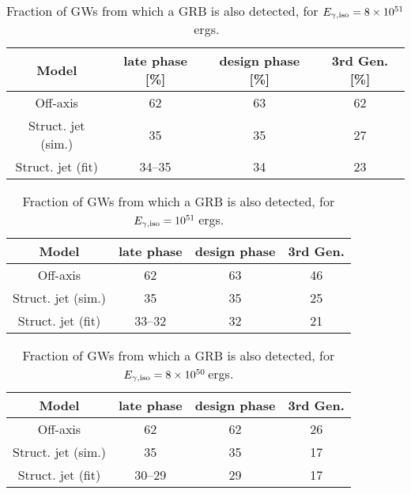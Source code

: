 \begin{table}
	\centering
	\caption{\label{ResultsPercent8e51} Fraction of GWs from which a GRB is also detected, for $E_{\rm \gamma,iso}=8\times 10^{51}$\,ergs.}
	\begin{tabular}{|c|c|c|c|}
		\hline
		Model              & late phase [\%] & design phase [\%] & 3rd Gen. [\%] \\ \hline
		Off-axis           & 62              & 63                & 62            \\ \hline
		Struct. jet (sim.) & 35              & 35                & 27            \\ \hline
		Struct. jet (fit)  & 34--35          & 34                & 23            \\ \hline
	\end{tabular}
\end{table}

\begin{table}
	\centering
	\caption{\label{ResultsPercent1e51} Fraction of GWs from which a GRB is also detected, for $E_{\rm \gamma,iso}=10^{51}$\,ergs.}
	\begin{tabular}{|c|c|c|c|}
		\hline
		Model              & late phase & design phase & 3rd Gen. \\ \hline
		Off-axis           & 62         & 63           & 46       \\ \hline
		Struct. jet (sim.) & 35         & 35           & 25       \\ \hline
		Struct. jet (fit)  & 33--32     & 32           & 21       \\ \hline
	\end{tabular}
\end{table}


\begin{table}
	\centering
	\caption{\label{ResultsPercent1e50} Fraction of GWs from which a GRB is also detected, for $E_{\rm \gamma,iso}=8\times 10^{50}$\,ergs.}
	\begin{tabular}{|c|c|c|c|}
		\hline
		Model              & late phase & design phase & 3rd Gen. \\ \hline
		Off-axis           & 62     & 62           & 26       \\ \hline
		Struct. jet (sim.) & 35     & 35           & 17       \\ \hline
		Struct. jet (fit)  & 30--29     & 29           & 17	       \\ \hline
	\end{tabular}
\end{table}








